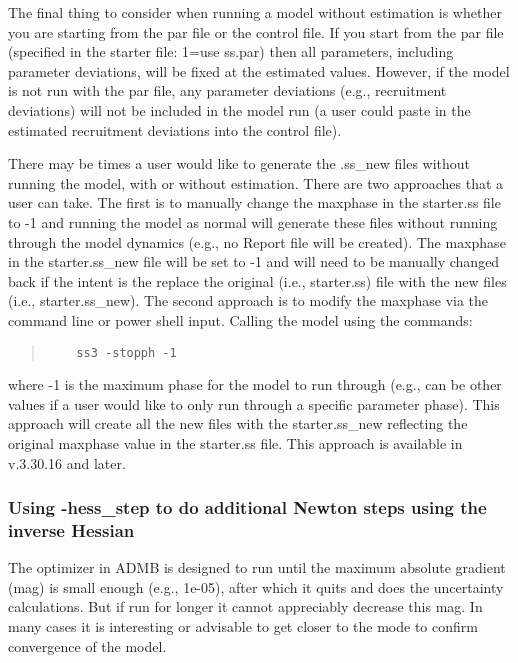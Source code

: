 The final thing to consider when running a model without estimation is whether you are starting from the par file or the control file. If you start from the par file (specified in the starter file: 1=use ss.par) then all parameters, including parameter deviations, will be fixed at the estimated values.  However, if the model is not run with the par file, any parameter deviations (e.g., recruitment deviations) will not be included in the model run (a user could paste in the estimated recruitment deviations into the control file). 

There may be times a user would like to generate the .ss\_new files without running the model, with or without estimation. There are two approaches that a user can take. The first is to manually change the maxphase in the starter.ss file to -1 and running the model as normal will generate these files without running through the model dynamics (e.g., no Report file will be created). The maxphase in the starter.ss\_new file will be set to -1 and will need to be manually changed back if the intent is the replace the original (i.e., starter.ss) file with the new files (i.e., starter.ss\_new).  The second approach is to modify the maxphase via the command line or power shell input. Calling the model using the commands:

\begin{quote}
	\begin{verbatim}
	ss3 -stopph -1
	\end{verbatim}
\end{quote}  

where -1 is the maximum phase for the model to run through (e.g., can be other values if a user would like to only run through a specific parameter phase). This approach will create all the new files with the starter.ss\_new reflecting the original maxphase value in the starter.ss file. This approach is available in v.3.30.16 and later.

\hypertarget{hess-step}{}
\subsubsection{Using -hess\_step to do additional Newton steps using the inverse Hessian}

The optimizer in ADMB is designed to run until the maximum absolute gradient (mag) is small enough (e.g., 1e-05), after which it quits and does the uncertainty calculations. But if run for longer it cannot appreciably decrease this mag. In many cases it is interesting or advisable to get closer to the mode to confirm convergence of the model. 

